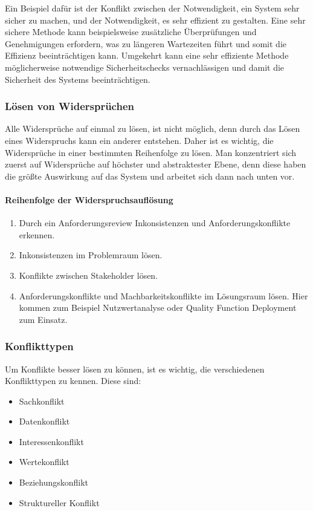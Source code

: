 Ein Beispiel dafür ist der Konflikt zwischen der Notwendigkeit, ein System sehr sicher zu machen,
und der Notwendigkeit, es sehr effizient zu gestalten.
Eine sehr sichere Methode kann beispielsweise zusätzliche Überprüfungen und Genehmigungen erfordern,
was zu längeren Wartezeiten führt und somit die Effizienz beeinträchtigen kann.
Umgekehrt kann eine sehr effiziente Methode möglicherweise notwendige Sicherheitschecks vernachlässigen
und damit die Sicherheit des Systems beeinträchtigen.\autocite[vgl.][S.236]{Herrmann.2022}

\subsubsection{Lösen von Widersprüchen}\label{subsubsec:loesen}
Alle Widersprüche auf einmal zu lösen, ist nicht möglich,
denn durch das Lösen eines Widerspruchs kann ein anderer entstehen.
Daher ist es wichtig, die Widersprüche in einer bestimmten Reihenfolge zu lösen.
Man konzentriert sich zuerst auf Widersprüche auf höchster und abstraktester Ebene,
denn diese haben die größte Auswirkung auf das System und arbeitet sich dann nach unten vor.

\paragraph{Reihenfolge der Widerspruchsauflösung}
\begin{enumerate}
    \item Durch ein Anforderungsreview Inkonsistenzen und Anforderungskonflikte erkennen.
    \item Inkonsistenzen im Problemraum lösen.
    \item Konflikte zwischen Stakeholder lösen.
    \item Anforderungskonflikte und Machbarkeitskonflikte im Lösungsraum lösen.
    Hier kommen zum Beispiel Nutzwertanalyse oder Quality Function Deployment zum Einsatz.
\end{enumerate}\autocite[vgl.][S.237f]{Herrmann.2022}

\subsubsection{Konflikttypen}
Um Konflikte besser lösen zu können, ist es wichtig, die verschiedenen Konflikttypen zu kennen.
Diese sind:
\begin{itemize}
    \item Sachkonflikt
    \item Datenkonflikt
    \item Interessenkonflikt
    \item Wertekonflikt
    \item Beziehungskonflikt
    \item Struktureller Konflikt
\end{itemize}\autocite[vgl.][S.137]{Pohl.2021}

